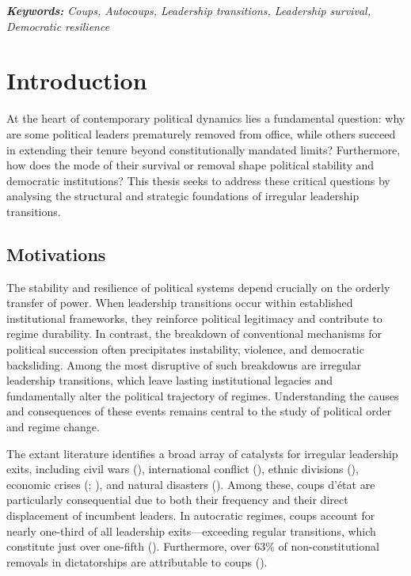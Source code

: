 \documentclass[
  12pt,
]{report}
\begin{document}
\emph{\textbf{Keywords:} Coups, Autocoups, Leadership transitions,
Leadership survival, Democratic resilience}

\chapter{Introduction}\label{introduction}

At the heart of contemporary political dynamics lies a fundamental
question: why are some political leaders prematurely removed from
office, while others succeed in extending their tenure beyond
constitutionally mandated limits? Furthermore, how does the mode of
their survival or removal shape political stability and democratic
institutions? This thesis seeks to address these critical questions by
analysing the structural and strategic foundations of irregular
leadership transitions.

\section{Motivations}\label{motivations}

The stability and resilience of political systems depend crucially on
the orderly transfer of power. When leadership transitions occur within
established institutional frameworks, they reinforce political
legitimacy and contribute to regime durability. In contrast, the
breakdown of conventional mechanisms for political succession often
precipitates instability, violence, and democratic backsliding. Among
the most disruptive of such breakdowns are irregular leadership
transitions, which leave lasting institutional legacies and
fundamentally alter the political trajectory of regimes. Understanding
the causes and consequences of these events remains central to the study
of political order and regime change.

The extant literature identifies a broad array of catalysts for
irregular leadership exits, including civil wars
(), international
conflict (),
ethnic divisions (), economic crises (;
), and natural
disasters (). Among these, coups d'état are particularly consequential due to
both their frequency and their direct displacement of incumbent leaders.
In autocratic regimes, coups account for nearly one-third of all
leadership exits---exceeding regular transitions, which constitute just
over one-fifth ().
Furthermore, over 63\% of non-constitutional removals in dictatorships
are attributable to coups ().
\end{document}
